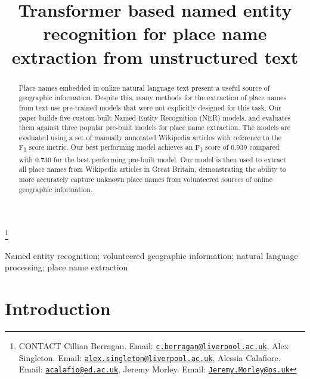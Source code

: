 \documentclass[]{interact}
\theoremstyle{plain}%
\theoremstyle{definition}
\theoremstyle{remark}
\begin{document}

\title{Transformer based named entity recognition for place name
extraction from unstructured text}


\author{
}

\thanks{CONTACT Cillian
Berragan. Email: \href{mailto:c.berragan@liverpool.ac.uk}{\nolinkurl{c.berragan@liverpool.ac.uk}}, Alex
Singleton. Email: \href{mailto:alex.singleton@liverpool.ac.uk}{\nolinkurl{alex.singleton@liverpool.ac.uk}}, Alessia
Calafiore. Email: \href{mailto:acalafio@ed.ac.uk}{\nolinkurl{acalafio@ed.ac.uk}}, Jeremy
Morley. Email: \href{mailto:Jeremy.Morley@os.uk}{\nolinkurl{Jeremy.Morley@os.uk}}}

\maketitle

\begin{abstract}
Place names embedded in online natural language text present a useful
source of geographic information. Despite this, many methods for the
extraction of place names from text use pre-trained models that were not
explicitly designed for this task. Our paper builds five custom-built
Named Entity Recognition (NER) models, and evaluates them against three
popular pre-built models for place name extraction. The models are
evaluated using a set of manually annotated Wikipedia articles with
reference to the F\textsubscript{1} score metric. Our best performing
model achieves an F\textsubscript{1} score of 0.939 compared with 0.730
for the best performing pre-built model. Our model is then used to
extract all place names from Wikipedia articles in Great Britain,
demonstrating the ability to more accurately capture unknown place names
from volunteered sources of online geographic information.
\end{abstract}

\begin{keywords}
Named entity recognition; volunteered geographic information; natural
language processing; place name extraction
\end{keywords}

\hypertarget{introduction}{%
\section{Introduction}\label{introduction}}
\end{document}
